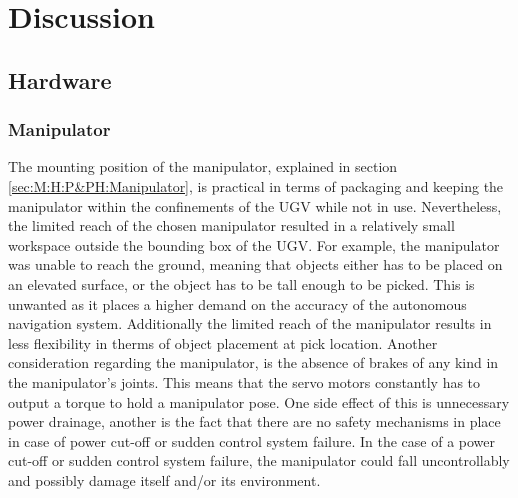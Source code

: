 \chapter{Discussion}\label{sec:Discussion}


\section{Hardware}\label{D:Hardware}


\subsection{Manipulator} \label{sec:D:H:Manipulator}
The mounting position of the manipulator, explained in section \ref{sec:M:H:P&PH:Manipulator}, is practical in terms of packaging and keeping the manipulator within the confinements of the UGV while not in use. Nevertheless, the limited reach of the chosen manipulator resulted in a relatively small workspace outside the bounding box of the UGV. For example, the manipulator was unable to reach the ground, meaning that objects either has to be placed on an elevated surface, or the object has to be tall enough to be picked. This is unwanted as it places a higher demand on the accuracy of the autonomous navigation system. Additionally the limited reach of the manipulator results in less flexibility in therms of object placement at pick location.
Another consideration regarding the manipulator, is the absence of brakes of any kind in the manipulator's joints. This means that the servo motors constantly has to output a torque to hold a manipulator pose. One side effect of this is unnecessary power drainage, another is the fact that there are no safety mechanisms in place in case of power cut-off or sudden control system failure. In the case of a power cut-off or sudden control system failure, the manipulator could fall uncontrollably and possibly damage itself and/or its environment.

